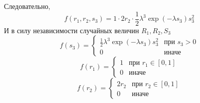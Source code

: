 \documentclass[12pt]{article} %
\theoremstyle{definition} %
\begin{document}
Следовательно,
\[
    f(r_1, r_2, s_3) = 1 \cdot 2 r_2 \cdot \frac{1}{2} \lambda^3 \exp(- \lambda s_3) s_3^2
\]
И в силу независимости случайных величин $R_1, R_2, S_3$
\[
    f(s_3) =
    \begin{cases}
        \frac{1}{2} \lambda^3 \exp(- \lambda s_3) s_3^2 &\text{при $s_3 > 0$}\\
        0 &\text{иначе}
    \end{cases}
\]
\[
    f(r_1) =
    \begin{cases}
        1 &\text{при $r_1 \in [0,1]$}\\
        0 &\text{иначе}
    \end{cases}
\]
\[
    f(r_2) =
    \begin{cases}
        2 r_2 &\text{при $r_2 \in [0,1]$}\\
        0 &\text{иначе}
    \end{cases}
\]
\end{document}

